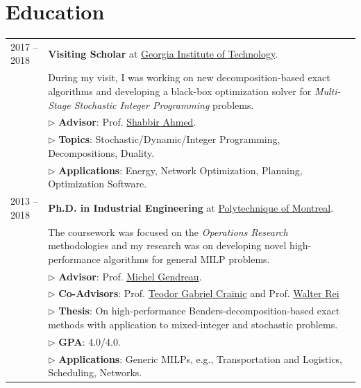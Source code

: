 \documentclass[10PT,letter]{article}
\newcommand{\numbox}[1]{} %
\begin{document}
\section*{\numbox{2}\bfseries\textcolor{titlecol}{\sffamily Education}}
        \begin{tabular}{lp{5.5in}}
	            \textsc{2017 -- 2018} & \textbf{Visiting Scholar} at \href{https://www.isye.gatech.edu}{Georgia Institute of Technology}.
	            \\[.5mm]
	            & During my visit, I was working on   new decomposition-based exact algorithms and  developing a black-box optimization solver for  \textit{Multi-Stage Stochastic Integer Programming} problems.\\[.5mm]
	            & $\triangleright$ {\small\textbf{Advisor}}:  Prof. \href{https://www2.isye.gatech.edu/people/faculty/Shabbir_Ahmed/}{Shabbir Ahmed}.\\[1.1mm]
	            & $\triangleright$ {\small\textbf{Topics}}: Stochastic/Dynamic/Integer Programming, Decompositions, Duality.\\
	            & $\triangleright$ {\small\textbf{Applications}}: Energy, Network Optimization, Planning, Optimization Software.\\[4mm]
	            \textsc{2013 -- 2018} & \textbf{Ph.D. in Industrial Engineering} at \href{https://www.polymtl.ca/magi/}{Polytechnique of Montreal}.\\[.5mm]
	            & The coursework was   focused on the \textit{Operations Research} methodologies and my research was  on developing novel high-performance algorithms for general MILP problems.\\[.5mm]
	            & $\triangleright$ {\small\textbf{Advisor}}:  Prof. \href{https://www.polymtl.ca/expertises/en/gendreau-michel}{Michel Gendreau}.\\[1.1mm]
	            & $\triangleright$ {\small\textbf{Co-Advisors}}:  Prof. \href{https://professeurs.uqam.ca/professeur?c=crainic.teodor}{Teodor Gabriel Crainic} and Prof. \href{https://professeurs.uqam.ca/professeur?c=rei.walter}{Walter Rei} \\[1.1mm]
	            & $\triangleright$ {\small\textbf{Thesis}}: On high-performance Benders-decomposition-based exact methods with application to mixed-integer and stochastic problems.\\
	            & $\triangleright$ {\small\textbf{GPA}}: 4.0/4.0.\\
	            & $\triangleright$ {\small\textbf{Applications}}: Generic MILPs, e.g., Transportation and Logistics, Scheduling, Networks.\\[4mm]

\end{tabular}
\end{document}
